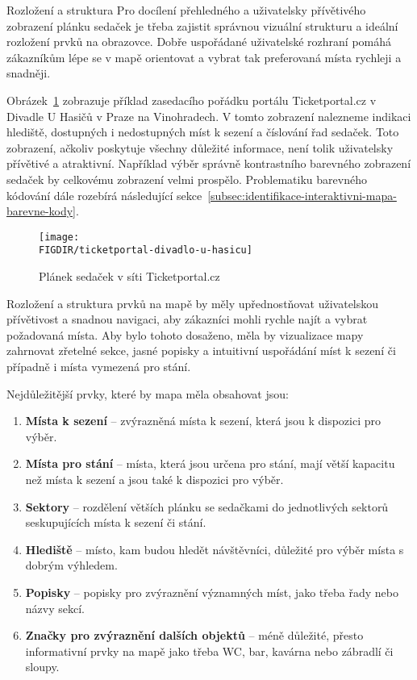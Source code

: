 \begin{subsection}{Rozložení a struktura}
    \label{subsec:identifikace-interaktivni-mapa-rozlozeni-a-struktura}
    Pro docílení přehledného a uživatelsky přívětivého zobrazení plánku sedaček je třeba zajistit správnou vizuální strukturu a ideální rozložení prvků na obrazovce.
    Dobře uspořádané uživatelské rozhraní pomáhá zákazníkům lépe se v mapě orientovat a vybrat tak preferovaná místa rychleji a snadněji.

    Obrázek~\ref{fig:venue-map-visualization-layout-and-structure} zobrazuje příklad zasedacího pořádku portálu Ticketportal.cz v Divadle U Hasičů v Praze na Vinohradech.
    V tomto zobrazení nalezneme indikaci hlediště, dostupných i nedostupných míst k sezení a číslování řad sedaček.
    Toto zobrazení, ačkoliv poskytuje všechny důležité informace, není tolik uživatelsky přívětivé a atraktivní.
    Například výběr správně kontrastního barevného zobrazení sedaček by celkovému zobrazení velmi prospělo.
    Problematiku barevného kódování dále rozebírá následující sekce~\ref{subsec:identifikace-interaktivni-mapa-barevne-kody}.

    \begin{figure}[H]
        \texttt{[image: \\FIGDIR/ticketportal-divadlo-u-hasicu]}
        \centering
        \caption{Plánek sedaček v síti Ticketportal.cz\cite{t__www_ticketportal_cz}}
        \label{fig:venue-map-visualization-layout-and-structure}
    \end{figure}

    Rozložení a struktura prvků na mapě by měly upřednostňovat uživatelskou přívětivost a snadnou navigaci, aby zákazníci mohli rychle najít a vybrat požadovaná místa.
    Aby bylo tohoto dosaženo, měla by vizualizace mapy zahrnovat zřetelné sekce, jasné popisky a intuitivní uspořádání míst k sezení či případně i místa vymezená pro stání.

    Nejdůležitější prvky, které by mapa měla obsahovat jsou:
    \begin{enumerate}
        \item \textbf{Místa k sezení} – zvýrazněná místa k sezení, která jsou k dispozici pro výběr.
        \item \textbf{Místa pro stání} – místa, která jsou určena pro stání, mají větší kapacitu než místa k sezení a jsou také k dispozici pro výběr.
        \item \textbf{Sektory} – rozdělení větších plánku se sedačkami do jednotlivých sektorů seskupujících místa k sezení či stání.
        \item \textbf{Hlediště} – místo, kam budou hledět návštěvníci, důležité pro výběr místa s dobrým výhledem.
        \item \textbf{Popisky} – popisky pro zvýraznění významných míst, jako třeba řady nebo názvy sekcí.
        \item \textbf{Značky pro zvýraznění dalších objektů} – méně důležité, přesto informativní prvky na mapě jako třeba WC, bar, kavárna nebo zábradlí či sloupy.
    \end{enumerate}


\end{subsection}
